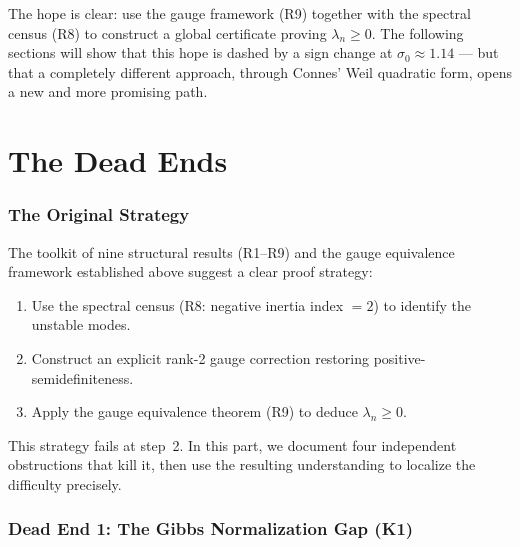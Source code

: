 \documentclass[12pt,a4paper]{article}
\theoremstyle{definition}
\theoremstyle{remark}
\begin{document}
The hope is clear: use the gauge framework (R9) together with the spectral census (R8) to construct a global certificate proving $\lambda_n \geq 0$. The following sections will show that this hope is dashed by a sign change at $\sigma_0 \approx 1.14$ --- but that a completely different approach, through Connes' Weil quadratic form, opens a new and more promising path.



\part*{The Dead Ends}


\section{The Original Strategy}
\label{sec:original-strategy}

The toolkit of nine structural results (R1--R9) and the gauge equivalence framework established above suggest a clear proof strategy:

\begin{enumerate}
  \item Use the spectral census (R8: negative inertia index $= 2$) to identify the unstable modes.
  \item Construct an explicit rank-2 gauge correction restoring positive-semidefiniteness.
  \item Apply the gauge equivalence theorem (R9) to deduce $\lambda_n \geq 0$.
\end{enumerate}

This strategy fails at step~2. In this part, we document four independent obstructions that kill it, then use the resulting understanding to localize the difficulty precisely.


\section{Dead End 1: The Gibbs Normalization Gap (K1)}
\label{sec:K1}
\end{document}
